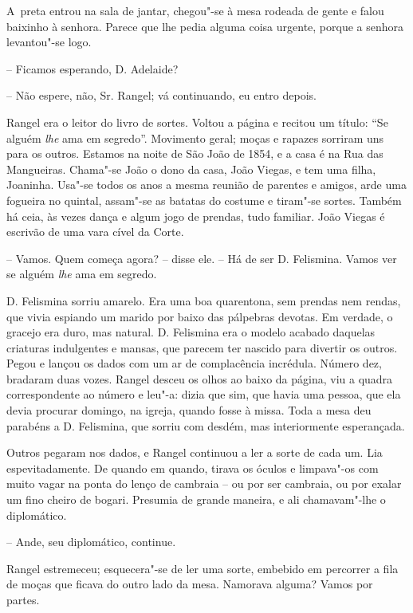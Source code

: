 A~preta entrou na sala de jantar, chegou"-se à mesa rodeada de gente e
falou baixinho à senhora. Parece que lhe pedia alguma coisa urgente,
porque a senhora levantou"-se logo.

-- Ficamos esperando, D. Adelaide?

-- Não espere, não, Sr. Rangel; vá continuando, eu entro depois.

Rangel era o leitor do livro de sortes. Voltou a página e recitou um
título: ``Se alguém \emph{lhe} ama em segredo''. Movimento geral; moças
e rapazes sorriram uns para os outros. Estamos na noite de São João de
1854, e a casa é na Rua das Mangueiras. Chama"-se João o dono da casa,
João Viegas, e tem uma filha, Joaninha. Usa"-se todos os anos a mesma
reunião de parentes e amigos, arde uma fogueira no quintal, assam"-se as
batatas do costume e tiram"-se sortes. Também há ceia, às vezes dança e
algum jogo de prendas, tudo familiar. João Viegas é escrivão de uma vara
cível da Corte.

-- Vamos. Quem começa agora? -- disse ele. -- Há de ser D. Felismina.
Vamos ver se alguém \emph{lhe} ama em segredo.

D. Felismina sorriu amarelo. Era uma boa quarentona, sem prendas nem
rendas, que vivia espiando um marido por baixo das pálpebras devotas. Em
verdade, o gracejo era duro, mas natural. D. Felismina era o modelo
acabado daquelas criaturas indulgentes e mansas, que parecem ter nascido
para divertir os outros. Pegou e lançou os dados com um ar de
complacência incrédula. Número dez, bradaram duas vozes. Rangel desceu
os olhos ao baixo da página, viu a quadra correspondente ao número e
leu"-a: dizia que sim, que havia uma pessoa, que ela devia procurar
domingo, na igreja, quando fosse à missa. Toda a mesa deu parabéns a D.
Felismina, que sorriu com desdém, mas interiormente esperançada.

Outros pegaram nos dados, e Rangel continuou a ler a sorte de cada um.
Lia espevitadamente. De quando em quando, tirava os óculos e limpava"-os
com muito vagar na ponta do lenço de cambraia -- ou por ser cambraia, ou
por exalar um fino cheiro de bogari. Presumia de grande maneira, e ali
chamavam"-lhe o diplomático.

-- Ande, seu diplomático, continue.

Rangel estremeceu; esquecera"-se de ler uma sorte, embebido em percorrer
a fila de moças que ficava do outro lado da mesa. Namorava alguma? Vamos
por partes.

